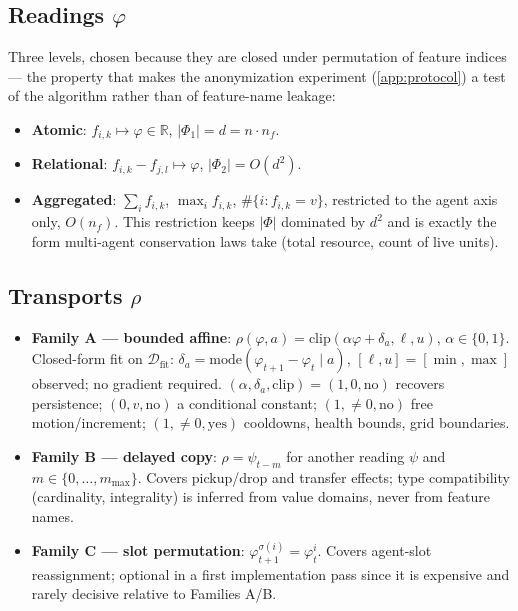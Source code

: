 \documentclass[11pt]{article}
\newcommand{\R}{\mathbb{R}}
\theoremstyle{plain}
\theoremstyle{definition}
\theoremstyle{remark}
\begin{document}
\subsection{Readings $\varphi$}
Three levels, chosen because they are closed under permutation of feature indices --- the property that makes the anonymization experiment (\autoref{app:protocol}) a test of the algorithm rather than of feature-name leakage:
\begin{itemize}
  \item \textbf{Atomic}: $f_{i,k}\mapsto \varphi\in\R$, $|\Phi_1|=d=n\cdot n_f$.
  \item \textbf{Relational}: $f_{i,k}-f_{j,l}\mapsto\varphi$, $|\Phi_2|=O(d^2)$.
  \item \textbf{Aggregated}: $\sum_i f_{i,k}$, $\max_i f_{i,k}$, $\#\{i:f_{i,k}=v\}$, restricted to the agent axis only, $O(n_f)$. This restriction keeps $|\Phi|$ dominated by $d^2$ and is exactly the form multi-agent conservation laws take (total resource, count of live units).
\end{itemize}

\subsection{Transports $\rho$}
\begin{itemize}
  \item \textbf{Family A --- bounded affine}: $\rho(\varphi,a)=\mathrm{clip}(\alpha\varphi+\delta_a,\ell,u)$, $\alpha\in\{0,1\}$. Closed-form fit on $\mathcal{D}_{\mathrm{fit}}$: $\delta_a=\mathrm{mode}(\varphi_{t+1}-\varphi_t\mid a)$, $[\ell,u]=[\min,\max]$ observed; no gradient required. $(\alpha,\delta_a,\mathrm{clip})=(1,0,\text{no})$ recovers persistence; $(0,v,\text{no})$ a conditional constant; $(1,\neq0,\text{no})$ free motion/increment; $(1,\neq0,\text{yes})$ cooldowns, health bounds, grid boundaries.
  \item \textbf{Family B --- delayed copy}: $\rho=\psi_{t-m}$ for another reading $\psi$ and $m\in\{0,\dots,m_{\max}\}$. Covers pickup/drop and transfer effects; type compatibility (cardinality, integrality) is inferred from value domains, never from feature names.
  \item \textbf{Family C --- slot permutation}: $\varphi^{\sigma(i)}_{t+1}=\varphi^i_t$. Covers agent-slot reassignment; optional in a first implementation pass since it is expensive and rarely decisive relative to Families A/B.
\end{itemize}
\end{document}
